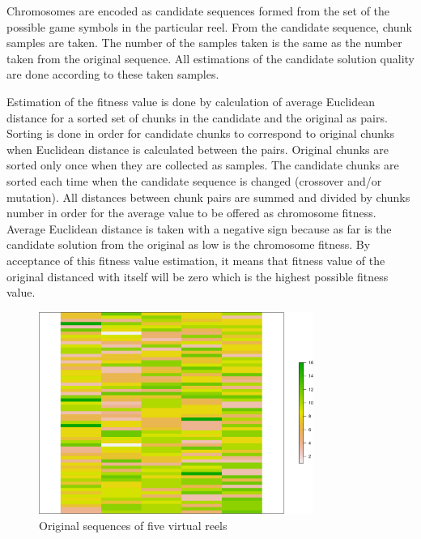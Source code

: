 \documentclass[11pt]{article}
\begin{document}
Chromosomes are encoded as candidate sequences formed from the set of the possible game symbols in the particular reel. From the candidate sequence, chunk samples are taken. The number of the samples taken is the same as the number taken from the original sequence. All estimations of the candidate solution quality are done according to these taken samples. 

Estimation of the fitness value is done by calculation of average Euclidean distance for a sorted set of chunks in the candidate and the original as pairs. Sorting is done in order for candidate chunks to correspond to original chunks when Euclidean distance is calculated between the pairs. Original chunks are sorted only once when they are collected as samples. The candidate chunks are sorted each time when the candidate sequence is changed (crossover and/or mutation). All distances between chunk pairs are summed and divided by chunks number in order for the average value to be offered as chromosome fitness. Average Euclidean distance is taken with a negative sign because as far is the candidate solution from the original as low is the chromosome fitness. By acceptance of this fitness value estimation, it means that fitness value of the original distanced with itself will be zero which is the highest possible fitness value.

\begin{figure}[h!]
\centering
\includegraphics[width=0.8\textwidth]{fig01}
\caption{Original sequences of five virtual reels}
\label{fig:01}
\end{figure}
\end{document}
